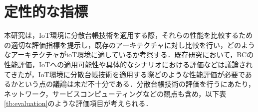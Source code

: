 \documentclass{kuisthesis}			%
\begin{document}
\section{定性的な指標}
本研究は，IoT環境に分散台帳技術を適用する際，それらの性能を比較するための適切な評価指標を提示し，既存のアーキテクチャに対し比較を行い，どのようなアーキテクチャがioT環境に適しているか考察する．既存研究において，BCの性能評価，IoTへの適用可能性や具体的なシナリオにおける評価などは議論されてきたが，IoT環境に分散台帳技術を適用する際どのような性能評価が必要であるかという点の議論は未だ不十分である．分散台帳技術の評価を行うにあたり，ネットワーク，サービスコンピューティングなどの観点も含め，以下表\ref{tb:evaluation}のような評価項目が考えられる．

\begin{table}[t]
    \begin{center}
\end{center}
\end{table}
\end{document}
